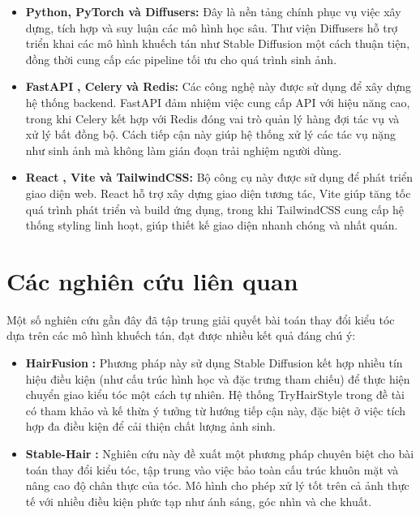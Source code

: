 \documentclass[../main.tex]{subfiles}
\begin{document}
\begin{itemize}
    \item \textbf{Python, PyTorch và Diffusers:}
    Đây là nền tảng chính phục vụ việc xây dựng, tích hợp và suy luận các mô hình học sâu. Thư viện Diffusers hỗ trợ triển khai các mô hình khuếch tán như Stable Diffusion một cách thuận tiện, đồng thời cung cấp các pipeline tối ưu cho quá trình sinh ảnh.

    \item \textbf{FastAPI} \cite{fastapi2023}\textbf{, Celery} \cite{celery2023} \textbf{và Redis:}
    Các công nghệ này được sử dụng để xây dựng hệ thống backend. FastAPI đảm nhiệm việc cung cấp API với hiệu năng cao, trong khi Celery kết hợp với Redis đóng vai trò quản lý hàng đợi tác vụ và xử lý bất đồng bộ. Cách tiếp cận này giúp hệ thống xử lý các tác vụ nặng như sinh ảnh mà không làm gián đoạn trải nghiệm người dùng.

    \item \textbf{React} \cite{react2023}\textbf{, Vite và TailwindCSS:}
    Bộ công cụ này được sử dụng để phát triển giao diện web. React hỗ trợ xây dựng giao diện tương tác, Vite giúp tăng tốc quá trình phát triển và build ứng dụng, trong khi TailwindCSS cung cấp hệ thống styling linh hoạt, giúp thiết kế giao diện nhanh chóng và nhất quán.
\end{itemize}

\section{Các nghiên cứu liên quan}
Một số nghiên cứu gần đây đã tập trung giải quyết bài toán thay đổi kiểu tóc dựa trên các mô hình khuếch tán, đạt được nhiều kết quả đáng chú ý:

\begin{itemize}
    \item \textbf{HairFusion} \cite{chung2024hairfusion}\textbf{:}
    Phương pháp này sử dụng Stable Diffusion kết hợp nhiều tín hiệu điều kiện (như cấu trúc hình học và đặc trưng tham chiếu) để thực hiện chuyển giao kiểu tóc một cách tự nhiên. Hệ thống TryHairStyle trong đề tài có tham khảo và kế thừa ý tưởng từ hướng tiếp cận này, đặc biệt ở việc tích hợp đa điều kiện để cải thiện chất lượng ảnh sinh.

    \item \textbf{Stable-Hair} \cite{zhang2024stablehair}\textbf{:}
    Nghiên cứu này đề xuất một phương pháp chuyên biệt cho bài toán thay đổi kiểu tóc, tập trung vào việc bảo toàn cấu trúc khuôn mặt và nâng cao độ chân thực của tóc. Mô hình cho phép xử lý tốt trên cả ảnh thực tế với nhiều điều kiện phức tạp như ánh sáng, góc nhìn và che khuất.
\end{itemize}
\end{document}
